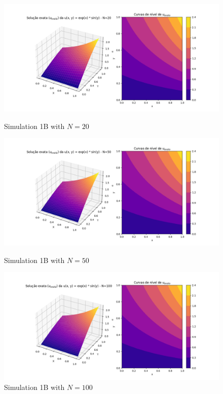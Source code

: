 \documentclass[aps,amsmath,amssymb,floatfix]{revtex4}
\begin{document}
\begin{enumerate}
\begin{enumerate}
	      	      \begin{figure}[H]
	      	      	\centering
	      	      	\begin{minipage}{0.32\textwidth}
	      	      		\centering
	      	      		\includegraphics[width=\textwidth]{img/Problem1/b_20.png}
	      	      		\caption{Simulation 1B with $N = 20$}
	      	      	\end{minipage}
	      	      	\hfill
	      	      	\begin{minipage}{0.32\textwidth}
	      	      		\centering
	      	      		\includegraphics[width=\textwidth]{img/Problem1/b_50.png}
	      	      		\caption{Simulation 1B with $N = 50$}
	      	      	\end{minipage}
	      	      	\hfill
	      	      	\begin{minipage}{0.32\textwidth}
	      	      		\centering
	      	      		\includegraphics[width=\textwidth]{img/Problem1/b_100.png}
	      	      		\caption{Simulation 1B with $N = 100$}
	      	      	\end{minipage}
	      	      \end{figure}
	      \end{enumerate}
	      

\end{enumerate}
\end{document}
